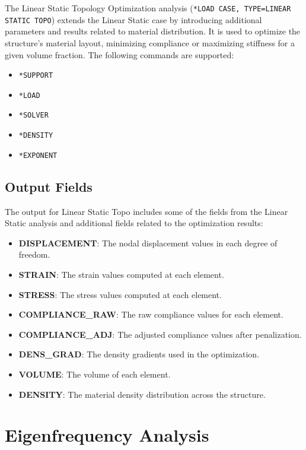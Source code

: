 The Linear Static Topology Optimization analysis (\texttt{*LOAD CASE, TYPE=LINEAR STATIC TOPO})
extends the Linear Static case by introducing additional parameters and results related to material distribution. It is used to optimize the structure's material layout, minimizing compliance or maximizing stiffness for a given volume fraction. The following commands are supported:

\begin{itemize}
    \item \texttt{*SUPPORT}
    \item \texttt{*LOAD}
    \item \texttt{*SOLVER}
    \item \texttt{*DENSITY}
    \item \texttt{*EXPONENT}
\end{itemize}

\subsection{Output Fields}
The output for Linear Static Topo includes some of the fields from the Linear Static analysis and additional fields related to the optimization results:

\begin{itemize}
    \item \textbf{DISPLACEMENT}: The nodal displacement values in each degree of freedom.
    \item \textbf{STRAIN}: The strain values computed at each element.
    \item \textbf{STRESS}: The stress values computed at each element.
    \item \textbf{COMPLIANCE\_RAW}: The raw compliance values for each element.
    \item \textbf{COMPLIANCE\_ADJ}: The adjusted compliance values after penalization.
    \item \textbf{DENS\_GRAD}: The density gradients used in the optimization.
    \item \textbf{VOLUME}: The volume of each element.
    \item \textbf{DENSITY}: The material density distribution across the structure.
\end{itemize}

\section{Eigenfrequency Analysis}
\label{sec:eigenfrequency_analysis}


